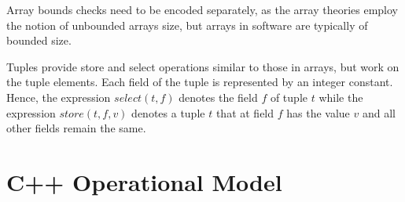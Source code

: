 \documentclass[a4paper]{llncs}
\begin{document}
\noindent
Array bounds checks need to be encoded separately, as the array theories
employ the notion of unbounded arrays size, but arrays in software are
typically of bounded size.


Tuples %
provide
\mbox{store} and \mbox{select} operations similar to those in arrays, but work
on the tuple \mbox{elements}. Each field of the tuple is represented by an
integer constant. Hence, the expression $\mathit{select}(t, f)$ denotes the field $f$
of tuple $t$ while the expression $\mathit{store}(t, f, v)$ denotes a tuple $t$
that at field $f$ has the value $v$ and all other fields remain the
same.

\section{C++ Operational Model}

\end{document}
